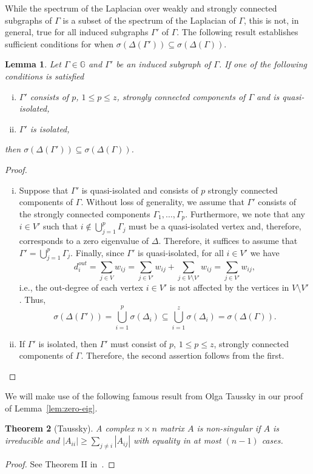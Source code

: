 \documentclass{article}
\newtheorem{theorem}{Theorem}[section]
\newtheorem{lemma}[theorem]{Lemma}
\newcommand\abs[1]{\left|#1\right|}
\begin{document}
While the spectrum of the Laplacian over weakly and strongly connected subgraphs of $\Gamma$ is a subset of the spectrum of the Laplacian of $\Gamma$, this is not, in general, true for all induced subgraphs $\Gamma'$ of $\Gamma$.
The following result establishes sufficient conditions for when $\sigma(\Delta(\Gamma'))\subseteq\sigma(\Delta(\Gamma))$.

\begin{lemma}\label{lem:subgraph}
Let $\Gamma\in\mathbb{G}$ and $\Gamma'$ be an induced subgraph of $\Gamma$. If one of the following conditions is satisfied
\begin{enumerate}[i.]
\item	$\Gamma'$ consists of $p$, $1\leq p\leq z$, strongly connected components of $\Gamma$ and is quasi-isolated,
\item	$\Gamma'$ is isolated,
\end{enumerate}
then $\sigma(\Delta(\Gamma'))\subseteq\sigma(\Delta(\Gamma))$.
\end{lemma}
\begin{proof}~
\begin{enumerate}[i.]
\item Suppose that $\Gamma'$ is quasi-isolated and consists of $p$ strongly connected components of $\Gamma$.
	Without loss of generality, we assume that $\Gamma'$ consists of the strongly connected components $\Gamma_{1},\ldots,\Gamma_{p}$. 
	Furthermore, we note that any $i\in V'$ such that $i\notin\bigcup_{j=1}^{p}\Gamma_{j}$ must be a quasi-isolated vertex and, therefore, corresponds to a zero eigenvalue of $\Delta$.
	Therefore, it suffices to assume that $\Gamma'=\bigcup_{j=1}^{p}\Gamma_{j}$.
	Finally, since $\Gamma'$ is quasi-isolated, for all $i\in V'$ we have
	\[
	d_{i}^{out}=\sum_{j\in V}w_{ij}=\sum_{j\in V'}w_{ij}+\sum_{j\in V\setminus{V'}}w_{ij}=\sum_{j\in V'}w_{ij},
	\]
	i.e., the out-degree of each vertex $i\in V'$ is not affected by the vertices in $V\setminus{V'}$.
	Thus,
	\[
	\sigma(\Delta(\Gamma'))=\bigcup_{i=1}^{p}\sigma(\Delta_{i})\subseteq\bigcup_{i=1}^{z}\sigma(\Delta_{i})=\sigma(\Delta(\Gamma)).
	\]
\item	If $\Gamma'$ is isolated, then $\Gamma'$ must consist of $p$, $1\leq p\leq z$, strongly connected components of $\Gamma$.
	Therefore, the second assertion follows from the first. 
\end{enumerate}
\end{proof}

We will make use of the following famous result from Olga Taussky in our proof of Lemma~\ref{lem:zero-eig}. 
\begin{theorem}[Taussky]\label{thm:taussky}
A complex $n\times n$ matrix $A$ is non-singular if $A$ is irreducible and $\abs{A_{ii}}\geq\sum_{j\neq i}\abs{A_{ij}}$ with equality in at most $(n-1)$ cases. 
\end{theorem}
\begin{proof}
See Theorem II in~\cite{Taussky1949}.
\end{proof}
\end{document}

